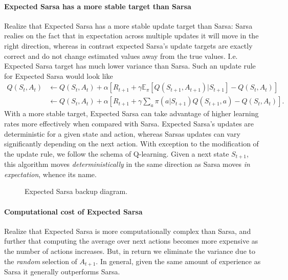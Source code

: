 \documentclass[12pt]{article}
\begin{document}
\paragraph{Expected Sarsa has a more stable target than Sarsa}
Realize that Expected Sarsa has a more stable update target than Sarsa: Sarsa realies on the fact that in expectation across multiple updates it will move in the right direction, whereas in contrast expected Sarsa's update targets are exactly correct and do not change estimated values away from the true values. I.e. Expected Sarsa target has much lower variance than Sarsa.
Such an update rule for Expected Sarsa would look like
\begin{align}
  Q(S_t, A_t) &\gets Q(S_t, A_t) + \alpha \left[R_{t+1} + \gamma \mathbb E_\pi \left[Q(S_{t+1},A_{t+1}) | S_{t+1}\right] - Q(S_t,                 A_t)\right] \nonumber \\
  &\gets Q(S_t, A_t) + \alpha \left[R_{t+1} + \gamma \sum_a \pi(a|S_{t+1}) Q(S_{t+1},a) - Q(S_t, A_t)\right].
\end{align}
With a more stable target, Expected Sarsa can take advantage of higher learning rates more effectively when compared with Sarsa. Expected Sarsa's updates are deterministic for a given state and action, whereas Sarsas updates can vary significantly depending on the next action.
With exception to the modification of the update rule, we follow the schema of Q-learning. Given a next state $S_{t+1}$, this algorithm moves \emph{deterministically} in the same direction as Sarsa moves \emph{in   expectation}, whence its name.

\begin{figure}[h]
  \centering
  \caption{\footnotesize Expected Sarsa backup diagram.}
\end{figure}

\paragraph{Computational cost of Expected Sarsa} Realize that Expected Sarsa is more computationally complex than Sarsa, and further that computing the average over next actions becomes more expensive as the number of actions increases. But, in return we eliminate the variance due to the \emph{random} selection of $A_{t+1}$. In general, given the same amount of experience as Sarsa it generally outperforms Sarsa.
\end{document}

